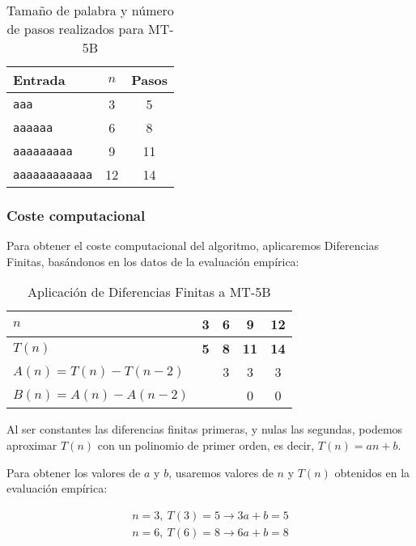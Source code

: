 \begin{table}[h]
    \centering
    \begin{tabular}{lcc}
        Entrada & $n$ & Pasos \\
        \hline
        \texttt{aaa}                &  3  & 5 \\
        \texttt{aaaaaa}             &  6  & 8 \\
        \texttt{aaaaaaaaa}          &  9  & 11 \\
        \texttt{aaaaaaaaaaaa}       & 12  & 14 \\
    \end{tabular}
    \caption{Tamaño de palabra y número de pasos realizados para MT-5B}
\end{table}


\subsubsection*{Coste computacional}
Para obtener el coste computacional del algoritmo, aplicaremos Diferencias Finitas, basándonos en los datos de la evaluación empírica:

\begin{table}[H]
    \centering
    \begin{tabular}{|l|c|c|c|c|}
        \hline
        $n$    & \textbf{3} & \textbf{6} & \textbf{9}  & \textbf{12} \\ \hline
        $T(n)$ & \textbf{5} & \textbf{8} & \textbf{11} & \textbf{14} \\ \hline
        \hline
        $A(n) = T(n) - T(n-2)$ &   & 3 & 3 & 3 \\ \hline
        $B(n) = A(n) - A(n-2)$ &   &   & 0 & 0 \\ \hline
    \end{tabular}
    \caption{Aplicación de Diferencias Finitas a MT-5B}
\end{table}

Al ser constantes las diferencias finitas primeras, y nulas las segundas, podemos aproximar $T(n)$ con un polinomio de primer orden, es decir, $T(n) = an + b$.\medskip

Para obtener los valores de $a$ y $b$, usaremos valores de $n$ y $T(n)$ obtenidos en la evaluación empírica:

\begin{subequations}
    \begin{gather}
        n = 3,\ T(3) = 5 \rightarrow 3a + b = 5 \\
        n = 6,\ T(6) = 8 \rightarrow 6a + b = 8
    \end{gather}
\end{subequations}

